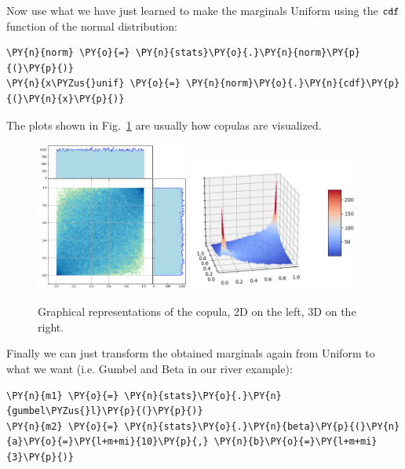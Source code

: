 Now use what we have just learned to make the marginals Uniform using
the \(\tt{cdf}\) function of the normal distribution:

\begin{tcolorbox}[breakable, size=fbox, boxrule=1pt, pad at break*=1mm,colback=cellbackground, colframe=cellborder]
\begin{Verbatim}[commandchars=\\\{\}]
\PY{n}{norm} \PY{o}{=} \PY{n}{stats}\PY{o}{.}\PY{n}{norm}\PY{p}{(}\PY{p}{)}
\PY{n}{x\PYZus{}unif} \PY{o}{=} \PY{n}{norm}\PY{o}{.}\PY{n}{cdf}\PY{p}{(}\PY{n}{x}\PY{p}{)}
\end{Verbatim}
\end{tcolorbox}

The plots shown in Fig.~\ref{fig:copula} are usually how copulas are visualized.

\begin{figure}[p]
\centering
\includegraphics[width=0.45\textwidth]{figures/lesson6_16_0.png}
\quad
\includegraphics[width=0.5\textwidth]{figures/copula_3d.png}
\caption{Graphical representations of the copula, 2D on the left, 3D on the right.}
\label{fig:copula}
\end{figure}

Finally we can just transform the obtained marginals again from Uniform to what we want
(i.e. Gumbel and Beta in our river example):

\begin{tcolorbox}[breakable, size=fbox, boxrule=1pt, pad at break*=1mm,colback=cellbackground, colframe=cellborder]
\begin{Verbatim}[commandchars=\\\{\}]
\PY{n}{m1} \PY{o}{=} \PY{n}{stats}\PY{o}{.}\PY{n}{gumbel\PYZus{}l}\PY{p}{(}\PY{p}{)}
\PY{n}{m2} \PY{o}{=} \PY{n}{stats}\PY{o}{.}\PY{n}{beta}\PY{p}{(}\PY{n}{a}\PY{o}{=}\PY{l+m+mi}{10}\PY{p}{,} \PY{n}{b}\PY{o}{=}\PY{l+m+mi}{3}\PY{p}{)}


\end{Verbatim}
\end{tcolorbox}

